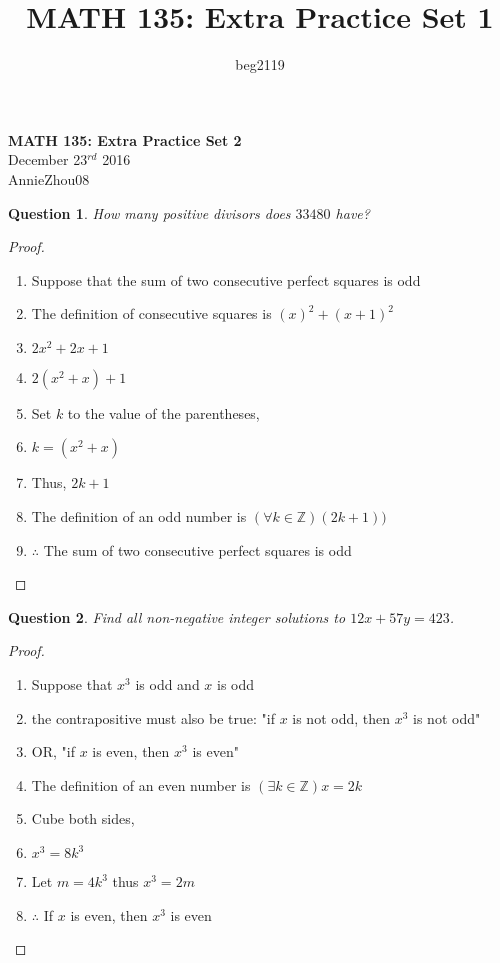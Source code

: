 \documentclass[11pt,oneside]{article}
\title{MATH 135: Extra Practice Set 1}
\author{beg2119}
\newtheorem{question}{Question}
\begin{document}
\begin{center}
    \textbf{MATH 135: Extra Practice Set 2} \\
    December 23$^{rd}$ 2016 \\

    AnnieZhou08
\end{center}

\bigskip

\begin{question}
    How many positive divisors does $33480$ have?
\end{question}

\begin{proof}
    \begin{enumerate}
        \item Suppose that the sum of two consecutive perfect squares is odd
        \item The definition of consecutive squares is $(x)^2 + (x+1)^2$
        \item $2x^2 + 2x + 1$
        \item $2(x^2 + x) + 1$
        \item Set $k$ to the value of the parentheses,
        \item $k=(x^2 + x)$
        \item Thus, $2k + 1$
        \item The definition of an odd number is $(\forall k \in \mathbb{Z})(2k + 1))$
        \item $\therefore$ The sum of two consecutive perfect squares is odd
    \end{enumerate}
\end{proof}

\bigskip

\begin{question}
    Find all non-negative integer solutions to $12x + 57y = 423$.
\end{question}

\begin{proof}
    \begin{enumerate}
        \item Suppose that $x^3$ is odd and $x$ is odd
        \item the contrapositive must also be true: "if $x$ is not odd, then $x^3$ is not odd"
        \item OR, "if $x$ is even, then $x^3$ is even"
        \item The definition of an even number is $(\exists k \in \mathbb{Z}) x = 2k$
        \item Cube both sides,
        \item $x^3 = 8k^3$
        \item Let $m = 4k^3$ thus $ x^3 = 2m$
        \item $\therefore$ If $x$ is even, then $x^3$ is even
    \end{enumerate}
\end{proof}
\end{document}
